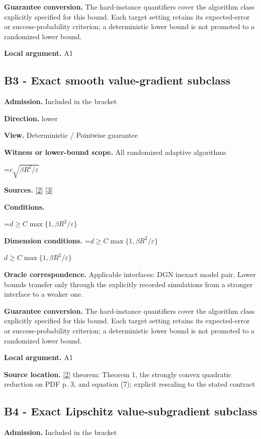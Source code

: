\documentclass[10pt,a4paper]{article}
\newcommand{\AtlasMath}[1]{\par\begingroup\centering\setbox0=\hbox{$\displaystyle #1$}\ifdim\wd0>1.4\linewidth\typeout{ATLAS WIDE FORMULA: \the\wd0}\fi\ifdim\wd0>\linewidth\resizebox{\linewidth}{!}{\box0}\else\box0\fi\par\endgroup}
\newcommand{\AtlasInlineMath}[1]{\begingroup\setbox0=\hbox{$#1$}\ifdim\wd0>.4\linewidth\endgroup\AtlasMath{#1}\else\endgroup$#1$\fi}
\begin{document}
\textbf{Guarantee conversion.} The hard-instance quantifiers cover the algorithm class explicitly specified for this bound. Each target setting retains its expected-error or success-probability criterion; a deterministic lower bound is not promoted to a randomized lower bound.

\textbf{Local argument.} A1

\subsection{B3 - Exact smooth value-gradient subclass}
\textbf{Admission.} Included in the bracket

\textbf{Direction.} lower

\textbf{View.} Deterministic / Pointwise guarantee

\textbf{Witness or lower-bound scope.} All randomized adaptive algorithms

\AtlasMath{c\sqrt{\beta R^2/\varepsilon}}
\textbf{Sources.} \href{https://arxiv.org/pdf/2609.10874}{[2]} \href{https://arxiv.org/pdf/1407.5144}{[3]}

\textbf{Conditions.} 
\AtlasMath{d\ge C\max\{1,\beta R^2/\varepsilon\}}


\textbf{Dimension conditions.} \AtlasInlineMath{d\ge C\max\{1,\beta R^2/\varepsilon\}}

\textbf{Oracle correspondence.} Applicable interfaces: DGN inexact model pair. Lower bounds transfer only through the explicitly recorded simulations from a stronger interface to a weaker one.

\textbf{Guarantee conversion.} The hard-instance quantifiers cover the algorithm class explicitly specified for this bound. Each target setting retains its expected-error or success-probability criterion; a deterministic lower bound is not promoted to a randomized lower bound.

\textbf{Local argument.} A1

\textbf{Source location.} \href{https://arxiv.org/pdf/2609.10874}{[2]} theorem: Theorem 1, the strongly convex quadratic reduction on PDF p. 3, and equation (7); explicit rescaling to the stated contract

\subsection{B4 - Exact Lipschitz value-subgradient subclass}
\textbf{Admission.} Included in the bracket
\end{document}
